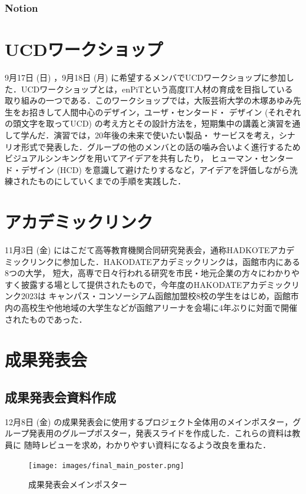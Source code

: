 \subsubsection{Notion}

\section{UCDワークショップ}
9月17日 (日) ，9月18日 (月) に希望するメンバでUCDワークショップに参加した．UCDワークショップとは，enPiTという高度IT人材の育成を目指している
取り組みの一つである．このワークショップでは，大阪芸術大学の木塚あゆみ先生をお招きして人間中心のデザイン，ユーザ・センタード・
デザイン (それぞれの頭文字を取ってUCD) の考え方とその設計方法を，短期集中の講義と演習を通して学んだ．演習では，20年後の未来で使いたい製品・
サービスを考え，シナリオ形式で発表した．グループの他のメンバとの話の噛み合いよく進行するためビジュアルシンキングを用いてアイデアを共有したり，
ヒューマン・センタード・デザイン (HCD) を意識して避けたりするなど，アイデアを評価しながら洗練されたものにしていくまでの手順を実践した．

\section{アカデミックリンク}
11月3日 (金) にはこだて高等教育機関合同研究発表会，通称HADKOTEアカデミックリンクに参加した．HAKODATEアカデミックリンクは，函館市内にある8つの大学，
短大，高専で日々行われる研究を市民・地元企業の方々にわかりやすく披露する場として提供されたもので，今年度のHAKODATEアカデミックリンク2023は
キャンパス・コンソーシアム函館加盟校8校の学生をはじめ，函館市内の高校生や他地域の大学生などが函館アリーナを会場に4年ぶりに対面で開催されたものであった．

\section{成果発表会}
\subsection{成果発表会資料作成}
12月8日 (金) の成果発表会に使用するプロジェクト全体用のメインポスター，グループ発表用のグループポスター，発表スライドを作成した．これらの資料は教員に
随時レビューを求め，わかりやすい資料になるよう改良を重ねた．

\begin{figure}[H]
    \centering
    \texttt{[image: images/final\_main\_poster.png]}
    \caption{成果発表会メインポスター}
    \label{fig:final_main_poster}
\end{figure}

